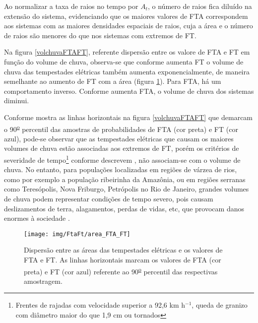Ao normalizar a taxa de raios no tempo por $A_t$, o número de raios fica diluído na extensão do sistema, evidenciando que os maiores valores de FTA correspondem aos sistemas com as maiores densidades espaciais de raios, cuja a área e o número de raios são menores do que nos sistemas com extremos de FT.

Na figura \ref{volchuvaFTAFT}, referente dispersão entre os valore de FTA e FT em função do volume de chuva, observa-se que conforme aumenta FT o volume de chuva das tempestades elétricas também aumenta exponencialmente, de maneira semelhante ao aumento de FT com a área (figura \ref{areaFTAFTA}). Para FTA, há um comportamento inverso. Conforme aumenta FTA, o volume de chuva dos sistemas diminui. 

Conforme mostra as linhas horizontais na figura \ref{volchuvaFTAFT} que demarcam o 90\textsuperscript{\underline{o}} percentil das amostras de probabilidades de FTA (cor preta) e FT (cor azul), pode-se observar que as tempestades elétricas que causam os maiores volumes de chuva estão associadas aos extremos de FT, porém os critérios de severidade de tempo\footnote{Frentes de rajadas com velocidade superior a 92,6 km h$^{-1}$, queda de granizo com diâmetro maior do que 1,9 cm ou tornados} conforme descrevem \cite{carey1998, williams1999, zipser2006}, não associam-se com o volume de chuva.  No entanto, para populações localizadas em regiões de várzea de rios, como por exemplo a população ribeirinha da Amazônia, ou em regiões serranas como Teresópolis, Nova Friburgo, Petrópolis no Rio de Janeiro, grandes volumes de chuva podem representar condições de tempo severo, pois causam deslizamentos de terra, alagamentos, perdas de vidas, etc, que provocam danos enormes à sociedade \cite{INPEchuvaSevera, WikichuvaSevera, BBC}.


\begin{figure}[!ht]
  \centering
  \texttt{[image: img/FtaFt/area\_FTA\_FT]}   
  \caption{Dispersão entre as áreas das tempestades elétricas e os valores de FTA e FT. As linhas horizontais marcam os valores de FTA (cor preta) e FT (cor azul) referente ao 90\textsuperscript{\underline{o}} percentil das respectivas amostragem.}
  \label{areaFTAFTA}  
\end{figure}

